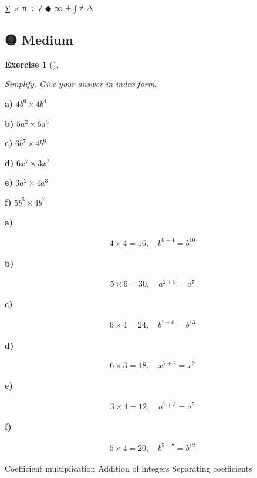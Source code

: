 \documentclass[
  letterpaper,
  DIV=11,
  numbers=noendperiod]{scrreprt}
\theoremstyle{definition}
\newtheorem{exercise}{Exercise}[chapter]
\theoremstyle{remark}
\begin{document}
∑ × π ÷ √ ◆ ∞ ± ∫ ≠ Δ

\subsection{🟡 Medium}

\begin{exercise}[]\protect\hypertarget{exr-u2-3}{}\label{exr-u2-3}

\emph{Simplify. Give your answer in index form.}

\textbf{a)} \(\displaystyle 4b^{6} \times 4b^{4}\)

\textbf{b)} \(\displaystyle 5a^{2} \times 6a^{5}\)

\textbf{c)} \(\displaystyle 6b^{7} \times 4b^{6}\)

\textbf{d)} \(\displaystyle 6x^{7} \times 3x^{2}\)

\textbf{e)} \(\displaystyle 3a^{2} \times 4a^{3}\)

\textbf{f)} \(\displaystyle 5b^{5} \times 4b^{7}\)

\begin{tcolorbox}[enhanced jigsaw, opacitybacktitle=0.6, coltitle=black, arc=.35mm, colframe=quarto-callout-tip-color-frame, colback=white, bottomrule=.15mm, left=2mm, colbacktitle=quarto-callout-tip-color!10!white, titlerule=0mm, opacityback=0, title=\textcolor{quarto-callout-tip-color}{\faLightbulb}\hspace{0.5em}{🔍 View Solutions}, leftrule=.75mm, breakable, rightrule=.15mm, bottomtitle=1mm, toptitle=1mm, toprule=.15mm]

\textbf{a)}

\[
\begin{aligned}
4\times 4=16,\quad b^{6+4}=b^{10}
\end{aligned}
\]

\textbf{b)}

\[
\begin{aligned}
5\times 6=30,\quad a^{2+5}=a^{7}
\end{aligned}
\]

\textbf{c)}

\[
\begin{aligned}
6\times 4=24,\quad b^{7+6}=b^{13}
\end{aligned}
\]

\textbf{d)}

\[
\begin{aligned}
6\times 3=18,\quad x^{7+2}=x^{9}
\end{aligned}
\]

\textbf{e)}

\[
\begin{aligned}
3\times 4=12,\quad a^{2+3}=a^{5}
\end{aligned}
\]

\textbf{f)}

\[
\begin{aligned}
5\times 4=20,\quad b^{5+7}=b^{12}
\end{aligned}
\]

\end{tcolorbox}

{Coefficient multiplication} {Addition of integers} {Separating
coefficients}

\end{exercise}
\end{document}
